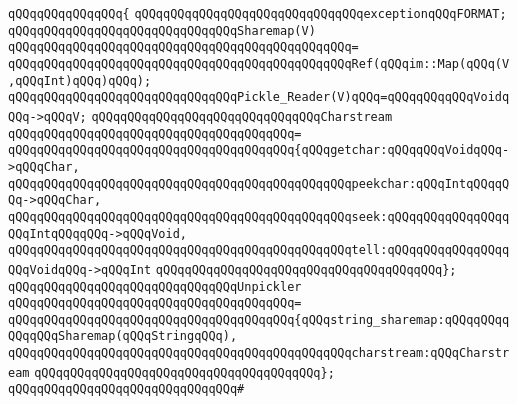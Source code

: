 \verb|qQQqqQQqqQQqqQQq{|\newline
\verb|qQQqqQQqqQQqqQQqqQQqqQQqqQQqqQQqexceptionqQQqFORMAT;|\newline
\newline
\newline
\verb|qQQqqQQqqQQqqQQqqQQqqQQqqQQqqQQqSharemap(V)|\newline
\verb|qQQqqQQqqQQqqQQqqQQqqQQqqQQqqQQqqQQqqQQqqQQqqQQq=|\newline
\verb|qQQqqQQqqQQqqQQqqQQqqQQqqQQqqQQqqQQqqQQqqQQqqQQqRef(qQQqim::Map(qQQq(V,qQQqInt)qQQq)qQQq);|\newline
\newline
\newline
\verb|qQQqqQQqqQQqqQQqqQQqqQQqqQQqqQQqPickle_Reader(V)qQQq=qQQqqQQqqQQqVoidqQQq->qQQqV;|\newline
\newline
\newline
\verb|qQQqqQQqqQQqqQQqqQQqqQQqqQQqqQQqCharstream|\newline
\verb|qQQqqQQqqQQqqQQqqQQqqQQqqQQqqQQqqQQqqQQq=|\newline
\verb|qQQqqQQqqQQqqQQqqQQqqQQqqQQqqQQqqQQqqQQq{qQQqgetchar:qQQqqQQqVoidqQQq->qQQqChar,|\newline
\verb|qQQqqQQqqQQqqQQqqQQqqQQqqQQqqQQqqQQqqQQqqQQqqQQqpeekchar:qQQqIntqQQqqQQq->qQQqChar,|\newline
\verb|qQQqqQQqqQQqqQQqqQQqqQQqqQQqqQQqqQQqqQQqqQQqqQQqseek:qQQqqQQqqQQqqQQqqQQqIntqQQqqQQq->qQQqVoid,|\newline
\verb|qQQqqQQqqQQqqQQqqQQqqQQqqQQqqQQqqQQqqQQqqQQqqQQqtell:qQQqqQQqqQQqqQQqqQQqVoidqQQq->qQQqInt|\newline
\verb|qQQqqQQqqQQqqQQqqQQqqQQqqQQqqQQqqQQqqQQq};|\newline
\newline
\newline
\verb|qQQqqQQqqQQqqQQqqQQqqQQqqQQqqQQqUnpickler|\newline
\verb|qQQqqQQqqQQqqQQqqQQqqQQqqQQqqQQqqQQqqQQq=|\newline
\verb|qQQqqQQqqQQqqQQqqQQqqQQqqQQqqQQqqQQqqQQq{qQQqstring_sharemap:qQQqqQQqqQQqqQQqSharemap(qQQqStringqQQq),|\newline
\verb|qQQqqQQqqQQqqQQqqQQqqQQqqQQqqQQqqQQqqQQqqQQqqQQqcharstream:qQQqCharstream|\newline
\verb|qQQqqQQqqQQqqQQqqQQqqQQqqQQqqQQqqQQqqQQq};|\newline
\newline
\verb|qQQqqQQqqQQqqQQqqQQqqQQqqQQqqQQq#|\newline
